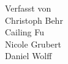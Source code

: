 \begin{titlepage}
	\begin{center}
		Verfasst von \\[3ex]
		Christoph Behr \\
		Cailing Fu \\
		Nicole Grubert \\
		Daniel Wolff \\
	\end{center}
	
	\restoregeometry
	
\end{titlepage}